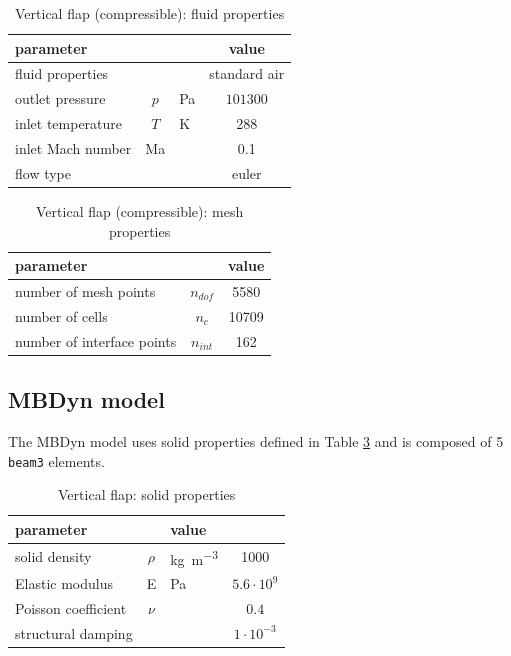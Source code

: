 \begin{table}[!h]
	\begin{center}
		\begin{tabular}{ l c l | c } 
			parameter & & & value  \\ 
			\hline
			fluid properties  &  &  & standard air   \\
			outlet pressure & $p$& \si{Pa} & $101300$  \\
			inlet temperature & $T$ & \si{K} & 288  \\
			inlet Mach number &  Ma &  & 0.1 \\
			flow type & & & euler \\
		\end{tabular}
	\end{center}
	\caption{Vertical flap (compressible): fluid properties}
	\label{table:comp-fluid}
\end{table}



\begin{table}[!h]
	\begin{center}
		\begin{tabular}{ l c | c } 
			parameter & & value   \\ 
			\hline
			number of mesh points  & $n_{dof}$ & 5580     \\
			number of cells & $n_c$ & 10709  \\
			number of interface points  & $n_{int}$ & 162  \\			
		\end{tabular}
	\end{center}
	\caption{Vertical flap (compressible): mesh properties}
	\label{table:comp-mesh}
\end{table}


\subsection{MBDyn model}


The MBDyn model uses solid properties defined in Table \ref{table:comp-solid} and is composed of 5 \texttt{beam3} elements. 

\begin{table}[!h]
	\begin{center}
		\begin{tabular}{ l c  l | c } 
			parameter & & value &    \\ 
			\hline
			solid density  & $\rho$ & \si{kg.m^{-3}} & 1000    \\
			Elastic modulus  & E & \si{Pa} & $ 5.6 \cdot 10^9$    \\
			Poisson coefficient & $\nu$ & & $0.4$  \\
			structural damping & & & $1 \cdot 10^{-3}$ \\
		\end{tabular}
	\end{center}
	\caption{Vertical flap: solid properties}
	\label{table:comp-solid}
\end{table}


